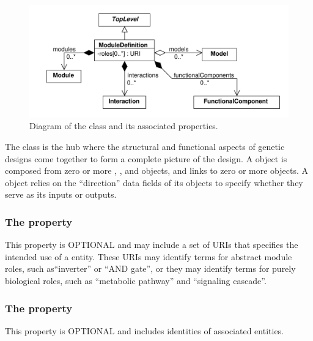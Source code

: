 
\begin{figure}[ht]
\begin{center}
\includegraphics[scale=0.6]{uml/module_definition}
\caption[]{Diagram of the  class and its associated properties.}
\label{uml:module_definition}
\end{center}
\end{figure}

The  class is the hub where the structural and functional aspects of genetic designs come together to form a complete picture of the design. 
A  object is composed from zero or more , , and  objects, and links to zero or more  objects. 
A  object relies on the ``direction'' data fields of its  objects to specify whether they serve as its inputs or outputs.

\subsubsection*{The  property}\label{sec:roles}
This property is OPTIONAL and may include a set of URIs that specifies the intended use of a  entity. 
These URIs may identify terms for abstract module roles, such as``inverter'' or ``AND gate'', or they may identify terms for purely biological roles, such as ``metabolic pathway'' and ``signaling cascade''.

\subsubsection*{The  property}\label{sec:models}
This property is OPTIONAL and includes identities of associated  entities.

